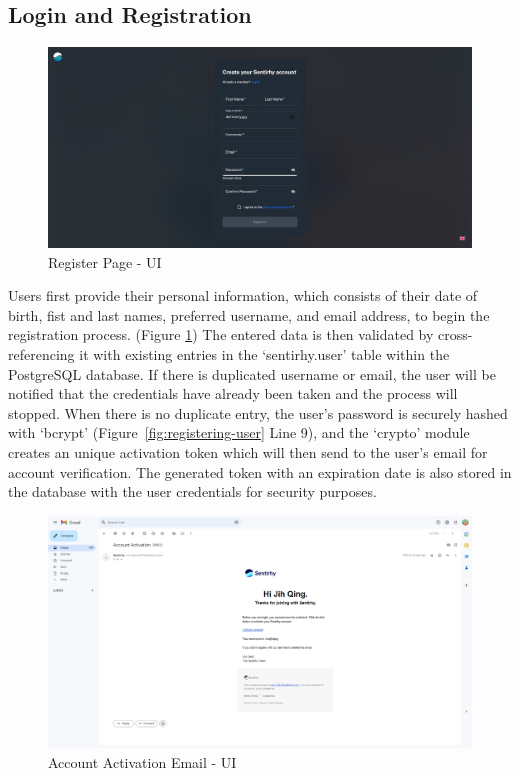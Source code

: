 \subsection{Login and Registration}
\begin{figure}[h!]
    \centering
    \includegraphics[width=14cm]{Images/register-ui.png}
    \caption{Register Page - UI}
    \label{fig:register-page-ui}
\end{figure}
Users first provide their personal information, which consists of their date of birth, fist and last names, preferred username, and email address, to begin the registration process. (Figure \ref{fig:register-page-ui}) 
The entered data is then validated by cross-referencing it with existing entries in the `sentirhy.user' table within the PostgreSQL database.
If there is duplicated username or email, the user will be notified that the credentials have already been taken and the process will stopped.
When there is no duplicate entry, the user's password is securely hashed with `bcrypt' (Figure~\ref{fig:registering-user} Line 9), and the `crypto' module creates an unique activation token which will then send to the user's email for account verification.
The generated token with an expiration date is also stored in the database with the user credentials for security purposes. 
\\
\begin{figure}[h!]
    \centering
    \includegraphics[width=14cm]{Images/acc-activation.png}
    \caption{Account Activation Email - UI}
    \label{fig:account-activation-ui}
\end{figure}
